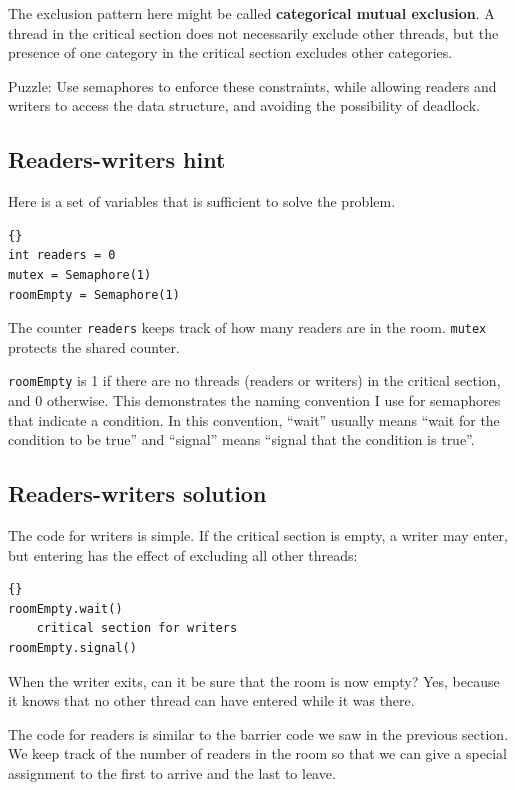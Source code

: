 \documentclass{book}
\newcommand{\clearemptydoublepage}{\newpage\cleardoublepage}
\begin{document}
The exclusion pattern here might be called {\bf categorical
mutual exclusion}.  A thread in the critical section
does not necessarily exclude other threads, but the presence
of one category in the critical section excludes other
categories.

Puzzle: Use semaphores to enforce these constraints, while allowing
readers and writers to access the data structure, and avoiding
the possibility of deadlock.


\clearemptydoublepage
\subsection{Readers-writers hint}

Here is a set of variables that is sufficient to solve the
problem.

\begin{lstlisting}[caption={Readers-writers initialization}]{}
int readers = 0
mutex = Semaphore(1)
roomEmpty = Semaphore(1)
\end{lstlisting}

The counter {\tt readers} keeps track of how many readers
are in the room.  {\tt mutex} protects the shared counter.

{\tt roomEmpty} is 1 if there are no threads (readers or writers) in
the critical section, and 0 otherwise.  This demonstrates the naming
convention I use for semaphores that indicate a condition.  In
this convention, ``wait'' usually means ``wait for the condition to
be true'' and ``signal'' means ``signal that the condition is true''.


\clearemptydoublepage
\subsection {Readers-writers solution}

The code for writers is simple.  If the critical section
is empty, a writer may enter, but entering has the effect
of excluding all other threads:

\begin{lstlisting}[caption={Writers solution}]{}
roomEmpty.wait()
    critical section for writers
roomEmpty.signal()
\end{lstlisting}

When the writer exits, can it be sure that the room is
now empty?  Yes, because it knows that no other thread can
have entered while it was there.

The code for readers is similar to the barrier code we
saw in the previous section.  We keep track of the number
of readers in the room so that we can give a special assignment
to the first to arrive and the last to leave.
\end{document}
